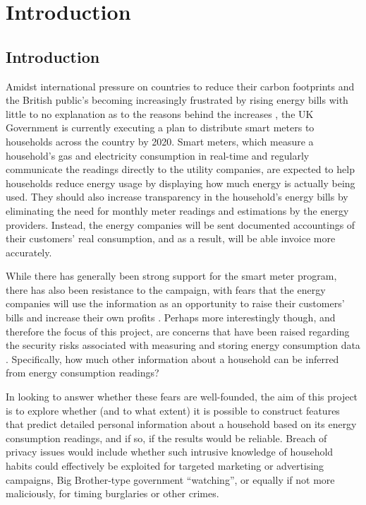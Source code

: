 \chapter{Introduction}
\section{Introduction}
Amidst international pressure on countries to reduce their carbon footprints \cite{E-comm} and the British public's becoming increasingly frustrated by rising energy bills with little to no explanation as to the reasons behind the increases \cite{E-spending}, the UK Government is currently executing a plan to distribute smart meters to households across the country by 2020. Smart meters, which measure a household's gas and electricity consumption in real-time and regularly communicate the readings  directly to the utility companies, are expected to help households reduce energy usage by displaying how much energy is actually being used. They should also increase transparency in the household's energy bills by eliminating the need for monthly meter readings and estimations by the energy providers. Instead, the energy companies will be sent documented accountings of their customers' real consumption, and as a result, will be able invoice more accurately.

While there has generally been strong support for the smart meter program, there has also been resistance to the campaign, with fears that the energy companies will use the information as an opportunity to raise their customers' bills and increase their own profits \cite{stop}. Perhaps more interestingly though, and therefore the focus of this project, are concerns that have been raised regarding the security risks associated with measuring and storing energy consumption data \cite{Quinn} \cite{LMW}. Specifically, how much other information about a household can be inferred from energy consumption readings? 

In looking to answer whether these fears are well-founded, the aim of this project is to explore whether (and to what extent) it is
possible to construct features that predict detailed personal information about a household based on its energy consumption readings, and if so, if the results would be reliable. Breach of privacy issues would include whether such intrusive knowledge of household habits could effectively be exploited for targeted marketing or advertising campaigns, Big Brother-type government “watching”, or equally if not more maliciously, for timing burglaries or other crimes. 

